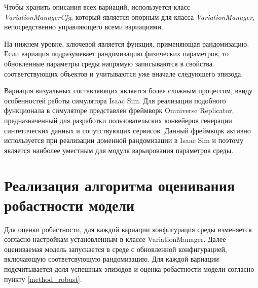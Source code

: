     Чтобы хранить описания всех вариаций, используется класс \\ \textit{VariationManagerCfg}, который является опорным для класса \textit{VariationManager}, непосредственно управляющего всеми вариациями. 

    На нижнем уровне, ключевой является функция, применяющая рандомизацию. Если вариация подразумевает рандомизацию физических параметров, то обновленные параметры среды напрямую записываются в свойства соответствующих объектов и учитываются уже вначале следующего эпизода. 

    Вариация визуальных составляющих является более сложным процессом, ввиду особенностей работы симулятора Isaac Sim. Для реализации подобного функционала в симуляторе представлен фреймворк Omniverse Replicator, предназначенный для разработки пользовательских конвейеров генерации синтетических данных и сопутствующих сервисов. Данный фреймворк активно используется при реализации доменной рандомизации в Isaac Sim и поэтому является наиболее уместным для модуля варьирования параметров среды.
    
\section{Реализация алгоритма оценивания робастности модели}

    Для оценки робастности, для каждой вариации конфигурация среды изменяется согласно настройкам установленным в классе VariationManager. Далее оцениваемая модель запускается в среде с обновленной конфигурацией, включающую соответсвующую рандомизацию. Для каждой вариации подсчитывается доля успешных эпизодов и оценка робастности модели согласно пункту \ref{method_robust}. 
    